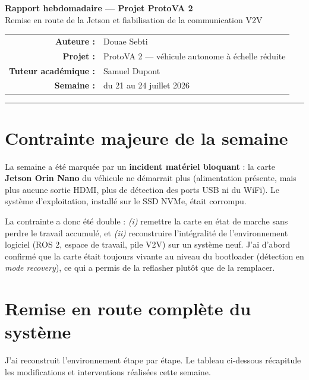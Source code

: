\documentclass[11pt,a4paper]{article}
\begin{document}
\begin{center}
{\color{problue}\Large\bfseries Rapport hebdomadaire — Projet ProtoVA 2}\\[4pt]
{\large Remise en route de la Jetson et fiabilisation de la communication V2V}\\[10pt]
\begin{tabular}{rl}
\textbf{Auteure :} & Douae Sebti \\
\textbf{Projet :} & ProtoVA 2 — véhicule autonome à échelle réduite \\
\textbf{Tuteur académique :} & Samuel Dupont \\
\textbf{Semaine :} & du 21 au 24 juillet 2026 \\
\end{tabular}
\end{center}
\vspace{4pt}
\hrule
\vspace{10pt}

\section{Contrainte majeure de la semaine}
La semaine a été marquée par un \textbf{incident matériel bloquant} : la carte
\textbf{Jetson Orin Nano} du véhicule ne démarrait plus (alimentation présente, mais
plus aucune sortie HDMI, plus de détection des ports USB ni du WiFi). Le système
d'exploitation, installé sur le SSD NVMe, était corrompu.

La contrainte a donc été double : \emph{(i)} remettre la carte en état de marche sans
perdre le travail accumulé, et \emph{(ii)} reconstruire l'intégralité de
l'environnement logiciel (ROS 2, espace de travail, pile V2V) sur un système neuf.
J'ai d'abord confirmé que la carte était toujours vivante au niveau du bootloader
(détection en \emph{mode recovery}), ce qui a permis de la reflasher plutôt que de la
remplacer.

\section{Remise en route complète du système}
J'ai reconstruit l'environnement étape par étape. Le tableau ci-dessous récapitule les
modifications et interventions réalisées cette semaine.
\end{document}
